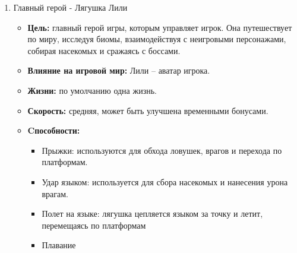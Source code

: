 \documentclass{article}
\begin{document}
\begin{enumerate}
\item Главный герой - Лягушка Лили
    \begin{itemize}
     \item \textbf{Цель:} главный герой игры, которым управляет игрок. Она путешествует по миру, исследуя биомы, взаимодействуя с неигровыми персонажами, собирая насекомых и сражаясь с боссами.
     \item \textbf{Влияние на игровой мир:} Лили – аватар игрока.
     \item \textbf{Жизни:} по умолчанию одна жизнь.
     \item \textbf{Скорость:} средняя, может быть улучшена временными бонусами.
     \item \textbf{Cпособности:}
     \begin{itemize}
            \item Прыжки: используются для обхода ловушек, врагов и перехода по платформам.
            \item Удар языком: используется для сбора насекомых и нанесения урона врагам.
            \item Полет на языке: лягушка цепляется языком за точку и летит, перемещаясь по платформам
            \item Плавание
     \end {itemize}
     \end{itemize}
\end{enumerate}
\end{document}
